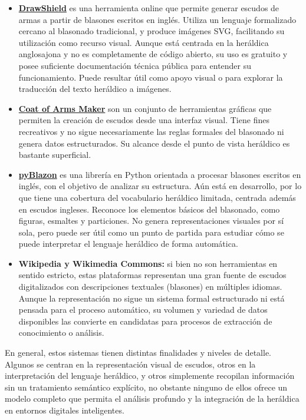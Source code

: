 \begin{itemize}
    \item \textbf{\href{https://drawshield.net/index.html}{DrawShield}} es una herramienta online que permite generar escudos de armas
    a partir de blasones escritos en inglés. Utiliza un lenguaje formalizado cercano al blasonado
    tradicional, y produce imágenes SVG, facilitando su utilización como recurso visual. Aunque está 
    centrada en la heráldica anglosajona y no es completamente de código abierto, su 
    uso es gratuito y posee suficiente documentación técnica pública para entender su 
    funcionamiento. Puede resultar útil como apoyo visual o para explorar la traducción del
    texto heráldico a imágenes.
    \item \textbf{\href{https://coamaker.com/}{Coat of Arms Maker}} son un conjunto de herramientas gráficas que permiten
    la creación de escudos desde una interfaz visual. Tiene fines recreativos y no sigue
    necesariamente las reglas formales del blasonado ni genera datos estructurados. Su alcance
    desde el punto de vista heráldico es bastante superficial.
    \item \textbf{\href{https://web.meson.org/pyBlazon/}{pyBlazon}} es una librería en Python orientada a procesar blasones escritos en
    inglés, con el objetivo de analizar su estructura. Aún está en desarrollo, por lo que tiene
    una cobertura del vocabulario heráldico limitada, centrada además en escudos ingleses.
    Reconoce los elementos básicos del blasonado, como figuras, esmaltes y particiones.
    No genera representaciones visuales por sí sola, pero puede ser útil como un punto de partida
    para estudiar cómo se puede interpretar el lenguaje heráldico de forma automática.
    \item \textbf{Wikipedia y Wikimedia Commons:} si bien no son herramientas en sentido estricto,
    estas plataformas representan una gran fuente de escudos digitalizados con descripciones
    textuales (blasones) en múltiples idiomas. Aunque la representación no sigue un sistema formal 
    estructurado ni está pensada para el proceso automático, su volumen y variedad de datos
    disponibles las convierte en candidatas para procesos de extracción de conocimiento o análisis.
\end{itemize}

En general, estos sistemas tienen distintas finalidades y niveles de detalle. Algunos se centran
en la representación visual de escudos, otros en la interpretación del lenguaje heráldico, y
otros simplemente recopilan información sin un tratamiento semántico explícito, no obstante ninguno
de ellos ofrece un modelo completo que permita el análisis profundo y la integración de la 
heráldica en entornos digitales inteligentes.

